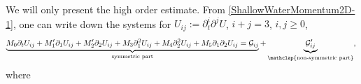 \documentclass[reqno,11pt]{amsart}
\theoremstyle{plain}
\theoremstyle{definition}
\numberwithin{equation}{section}
\begin{document}
We will only present the high order estimate. From \eqref{ShallowWaterMomentum2D-1}, one can write down
the systems for $U_{ij}:=\partial_t^i\partial^j U$, $ i + j = 3 $, $ i,j \geq 0 $,
\begin{equation}
\label{sys:dd-2d}
  \underbrace{M_0\partial_t U_{ij} +M_1'\partial_1 U_{ij}+M_2'\partial_2 U_{ij}+M_3\partial_1^2 U_{ij} +M_4 \partial_2^2 U_{ij}+M_5\partial_1\partial_2 U_{ij} =\mathcal{G}_{ij}}_{\text{symmetric part}}+\underbrace{\mathcal{G}'_{ij}}_{\mathclap{\text{non-symmetric part}}}, \\
\end{equation}
where 
\end{document}
